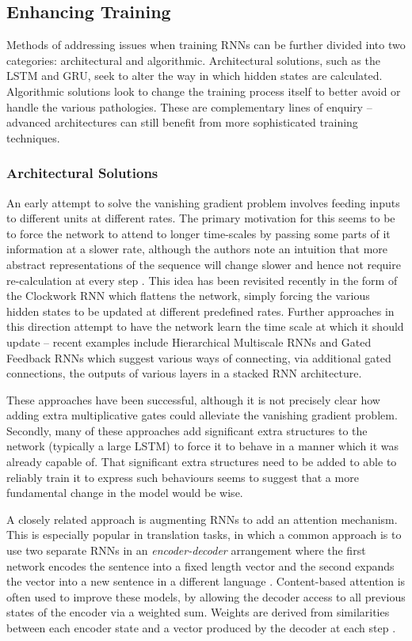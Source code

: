 \subsection{Enhancing Training}
Methods of addressing issues when training RNNs can be further divided into two categories:
architectural and algorithmic.
Architectural solutions, such as the LSTM and GRU, seek to alter
the way in which hidden states are calculated. Algorithmic solutions look to change the training
process itself to better avoid or handle the various pathologies. These are complementary lines of
enquiry -- advanced architectures can still benefit from more sophisticated training techniques.

\subsubsection{Architectural Solutions}
An early attempt to solve the vanishing gradient problem involves feeding inputs to different units
at different
rates. The primary motivation for this seems to be to force the network to attend to longer
time-scales by passing some parts of it information at a slower rate, although the authors note an
intuition that more abstract representations of the sequence will change slower and hence not
require re-calculation at every step \autocite{Hihi1995}. This idea has been revisited recently in
the form of the Clockwork RNN \autocite{Koutnik2014} which flattens the network, simply forcing
the various hidden states to be updated at different predefined rates. Further approaches in this
direction attempt to have the network learn the time scale at which it should update -- recent
examples include Hierarchical Multiscale RNNs \autocite{Chung2016} and Gated Feedback RNNs
\autocite{Chung2015} which suggest various ways of connecting, via additional gated connections,
the outputs of various layers in a stacked RNN architecture.

These approaches have been successful, although it is not precisely clear how adding extra
multiplicative gates could alleviate the vanishing gradient problem. Secondly, many of these
approaches add significant extra structures to the network (typically a large LSTM)
to force it to behave in a manner which
it was already capable of. That significant extra structures need to be added to able to reliably
train it to express such behaviours seems to suggest that a more fundamental change in the model
would be wise.

A closely related approach is augmenting RNNs to add an attention mechanism. This is especially
popular in translation tasks, in which a common approach is to use two separate RNNs in an
\emph{encoder-decoder} arrangement where the first network encodes the sentence into a fixed length
vector and the second expands the vector into a new sentence in a different language
\autocite{Cho2014b, Luong2016}. Content-based attention is often used to improve these models, 
by allowing the decoder access to all previous states of the encoder via a weighted sum. Weights
are derived from similarities between each encoder state and a vector produced by the decoder at
each step \autocite{Chan2015, Bahdanau2015}.

